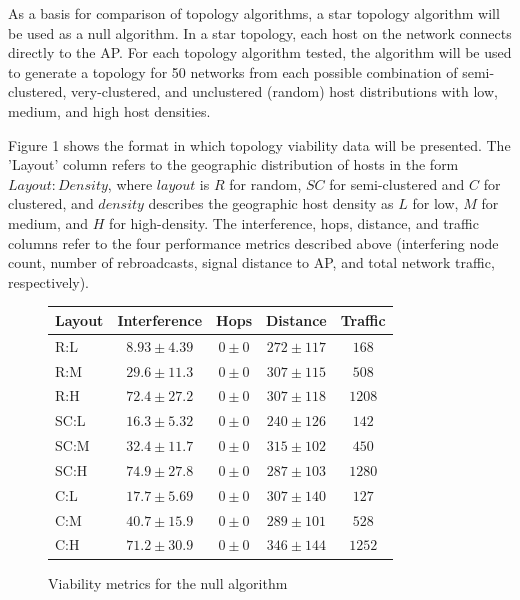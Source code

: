 \documentclass{sigcomm-alternate}
\begin{document}
As a basis for comparison of topology algorithms, a star topology algorithm will be used as a null algorithm. In a star topology, each host on the network connects directly to the AP. For each topology algorithm tested, the algorithm will be used to generate a topology for 50 networks from each possible combination of semi-clustered, very-clustered, and unclustered (random) host distributions with low, medium, and high host densities.

Figure 1 shows the format in which topology viability data will be presented. The 'Layout' column refers to the geographic distribution of hosts in the form $Layout:Density$, where $layout$ is $R$ for random, $SC$ for semi-clustered and $C$ for clustered, and $density$ describes the geographic host density as $L$ for low, $M$ for medium, and $H$ for high-density. The interference, hops, distance, and traffic columns refer to the four performance metrics described above (interfering node count, number of rebroadcasts, signal distance to AP, and total network traffic, respectively).


\begin{figure}[H]
  \centering
  
    \begin{tabular}{|l || c | c | c | c|}
    \hline
    Layout & Interference & Hops & Distance & Traffic \\
    \hline
    R:L & $8.93 \pm 4.39$ & $0 \pm 0$ & $272 \pm 117$ & $168$ \\
    R:M & $29.6 \pm 11.3$ & $0 \pm 0$ & $307 \pm 115$ & $508$ \\
    R:H & $72.4 \pm 27.2$ & $0 \pm 0$ & $307 \pm 118$ & $1208$ \\
    \hline
    SC:L & $16.3 \pm 5.32$ & $0 \pm 0$ & $240 \pm 126$ & $142$ \\
    SC:M & $32.4 \pm 11.7$ & $0 \pm 0$ & $315 \pm 102$ & $450$ \\
    SC:H & $74.9 \pm 27.8$ & $0 \pm 0$ & $287 \pm 103$ & $1280$ \\
    \hline
    C:L & $17.7 \pm 5.69$ & $0 \pm 0$ & $307 \pm 140$ & $127$ \\
    C:M & $40.7 \pm 15.9$ & $0 \pm 0$ & $289 \pm 101$ & $528$ \\
    C:H & $71.2 \pm 30.9$ & $0 \pm 0$ & $346 \pm 144$ & $1252$ \\
    \hline
    \end{tabular}
  
  \caption{Viability metrics for the null algorithm}
\end{figure}
\end{document}
